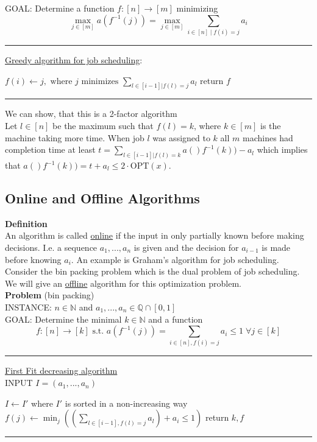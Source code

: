 \documentclass[a4paper, 12pt]{article}
\begin{document}
	\noindent GOAL: Determine a function $f: [n] \to [m]$ minimizing \[\max_{j \in [m]} a(f^{-1}(j)) = \max_{j \in [m]} \sum_{i \in [n] \; | \; f(i) = j} a_i\]
	
	\par\noindent\rule{\textwidth}{0.4pt}
	\noindent\underline{Greedy algorithm for job scheduling}:
	\begin{algorithmic}[1]
			\State $f(i) \gets j, \text{ where $j$ minimizes } \sum_{l \in [i-1] | f(l) = j} a_l$
		\EndFor
		\State return $f$
	\end{algorithmic}
	\par\noindent\rule{\textwidth}{0.4pt}
	We can show, that this is a 2-factor algorithm\\
	Let $l \in [n]$ be the maximum such that $f(l) = k$, where $k \in [m]$ is the machine taking more time. When job $l$ was assigned to $k$ all $m$ machines had completion time at least $t = \sum_{l \in [i-1] | f(l) = k} a()f^{-1}(k))-a_l$ which implies that $a()f^{-1}(k)) = t+a_l \leq 2\cdot\text{OPT}(x)$.
	
	\subsection{Online and Offline Algorithms}
	\textbf{Definition}\\
	An algorithm is called \underline{online} if the input in only partially known before making decisions. I.e. a sequence $a_1,...,a_n$ is given and the decision for $a_{i-1}$ is made before knowing $a_i$. An example is Graham's algorithm for job scheduling.\\
	
	Consider the bin packing problem which is the dual problem of job scheduling. We will give an \underline{offline} algorithm for this optimization problem.\\
	\textbf{Problem} (bin packing)\\
	INSTANCE: $n \in \mathbb{N}$ and $a_1,...,a_n \in \mathbb{Q} \cap [0,1]$\\
	GOAL: Determine the minimal $k \in \mathbb{N}$ and a function \[f: [n] \to [k] \text{ s.t. } a(f^{-1}(j)) = \sum_{i \in [n], f(i) = j} a_i \leq 1 \; \forall j \in [k]\]
	\par\noindent\rule{\textwidth}{0.4pt}
	\underline{First Fit decreasing algorithm}\\
	INPUT $I = (a_1,...,a_n)$
	\begin{algorithmic}[1]
		\State $I \gets I'$ where $I'$ is sorted in a non-increasing way
			\State $f(j) \gets \min_j ((\sum_{l \in [i-1], f(l) = j} a_l) + a_i \leq 1)$
		\EndFor
		\State return $k,f$
	\end{algorithmic}
	\par\noindent\rule{\textwidth}{0.4pt}
	
\end{document}
